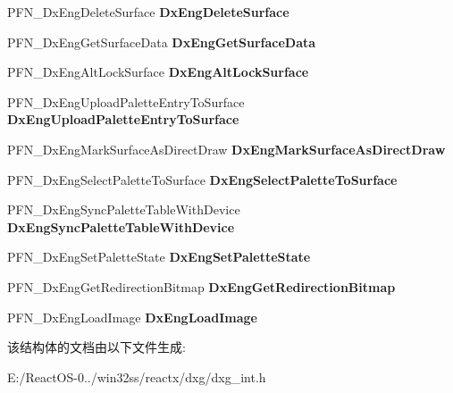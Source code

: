 \begin{DoxyCompactItemize}
\item 
\mbox{\label{struct___d_x_e_n_g___f_u_n_c_t_i_o_n_s_ab13817575cf5f84eaad52af5d3131b60}} 
P\+F\+N\+\_\+\+Dx\+Eng\+Delete\+Surface {\bfseries Dx\+Eng\+Delete\+Surface}
\item 
\mbox{\label{struct___d_x_e_n_g___f_u_n_c_t_i_o_n_s_aaaa3c917ca796f6b1e7c94383c026d40}} 
P\+F\+N\+\_\+\+Dx\+Eng\+Get\+Surface\+Data {\bfseries Dx\+Eng\+Get\+Surface\+Data}
\item 
\mbox{\label{struct___d_x_e_n_g___f_u_n_c_t_i_o_n_s_ac0cc41f17772a376f486c3045f68b2b3}} 
P\+F\+N\+\_\+\+Dx\+Eng\+Alt\+Lock\+Surface {\bfseries Dx\+Eng\+Alt\+Lock\+Surface}
\item 
\mbox{\label{struct___d_x_e_n_g___f_u_n_c_t_i_o_n_s_a8a86989342273bb179c9f3d1d6e30b90}} 
P\+F\+N\+\_\+\+Dx\+Eng\+Upload\+Palette\+Entry\+To\+Surface {\bfseries Dx\+Eng\+Upload\+Palette\+Entry\+To\+Surface}
\item 
\mbox{\label{struct___d_x_e_n_g___f_u_n_c_t_i_o_n_s_aef1f4d537e3dee74a401cf0bef186def}} 
P\+F\+N\+\_\+\+Dx\+Eng\+Mark\+Surface\+As\+Direct\+Draw {\bfseries Dx\+Eng\+Mark\+Surface\+As\+Direct\+Draw}
\item 
\mbox{\label{struct___d_x_e_n_g___f_u_n_c_t_i_o_n_s_accadc4738df307520a4a63f581ba14be}} 
P\+F\+N\+\_\+\+Dx\+Eng\+Select\+Palette\+To\+Surface {\bfseries Dx\+Eng\+Select\+Palette\+To\+Surface}
\item 
\mbox{\label{struct___d_x_e_n_g___f_u_n_c_t_i_o_n_s_a4faf3db6d82453e6ddf87d168d2c6d7e}} 
P\+F\+N\+\_\+\+Dx\+Eng\+Sync\+Palette\+Table\+With\+Device {\bfseries Dx\+Eng\+Sync\+Palette\+Table\+With\+Device}
\item 
\mbox{\label{struct___d_x_e_n_g___f_u_n_c_t_i_o_n_s_a708276b1b14a82a79993a7d8e3fc06cf}} 
P\+F\+N\+\_\+\+Dx\+Eng\+Set\+Palette\+State {\bfseries Dx\+Eng\+Set\+Palette\+State}
\item 
\mbox{\label{struct___d_x_e_n_g___f_u_n_c_t_i_o_n_s_aab4f715babca80e09ff3555f0cbebd78}} 
P\+F\+N\+\_\+\+Dx\+Eng\+Get\+Redirection\+Bitmap {\bfseries Dx\+Eng\+Get\+Redirection\+Bitmap}
\item 
\mbox{\label{struct___d_x_e_n_g___f_u_n_c_t_i_o_n_s_a659faf817a568b512bed113fa588283c}} 
P\+F\+N\+\_\+\+Dx\+Eng\+Load\+Image {\bfseries Dx\+Eng\+Load\+Image}
\end{DoxyCompactItemize}


该结构体的文档由以下文件生成\+:\begin{DoxyCompactItemize}
\item 
E\+:/\+React\+O\+S-\/0../win32ss/reactx/dxg/dxg\+\_\+int.\+h\end{DoxyCompactItemize}
